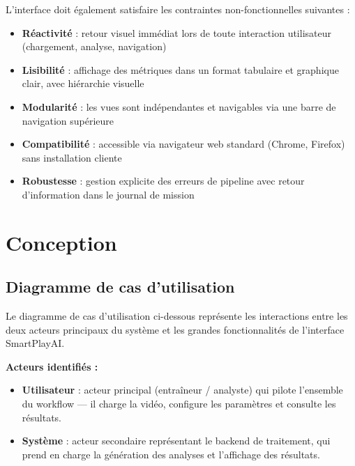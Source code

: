 L'interface doit également satisfaire les contraintes non-fonctionnelles suivantes :
 
\begin{itemize}[leftmargin=1.5em]
  \item \textbf{Réactivité} : retour visuel immédiat lors de toute interaction utilisateur
        (chargement, analyse, navigation)
  \item \textbf{Lisibilité} : affichage des métriques dans un format tabulaire et graphique
        clair, avec hiérarchie visuelle
  \item \textbf{Modularité} : les vues sont indépendantes et navigables via une barre de
        navigation supérieure
  \item \textbf{Compatibilité} : accessible via navigateur web standard (Chrome, Firefox)
        sans installation cliente
  \item \textbf{Robustesse} : gestion explicite des erreurs de pipeline avec retour
        d'information dans le journal de mission
\end{itemize}
 
\section{Conception}
 
\subsection{Diagramme de cas d'utilisation}
 
Le diagramme de cas d'utilisation ci-dessous représente les interactions entre les deux acteurs
principaux du système et les grandes fonctionnalités de l'interface SmartPlayAI.
 
\medskip
\noindent\textbf{Acteurs identifiés :}
\begin{itemize}[leftmargin=1.5em]
  \item \textbf{Utilisateur} : acteur principal (entraîneur / analyste) qui pilote l'ensemble
        du workflow — il charge la vidéo, configure les paramètres et consulte les résultats.
  \item \textbf{Système} : acteur secondaire représentant le backend de traitement, qui prend
        en charge la génération des analyses et l'affichage des résultats.
\end{itemize}
 
